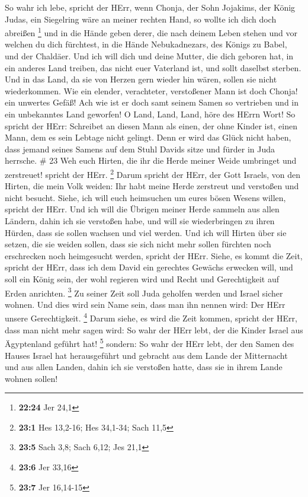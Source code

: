  So wahr ich lebe, spricht der HErr, wenn Chonja, der Sohn
Jojakims, der König Judas, ein Siegelring wäre an meiner rechten Hand,
so wollte ich dich doch abreißen \footnote{\textbf{22:24} Jer 24,1}
 und in die Hände geben derer, die nach deinem Leben stehen
und vor welchen du dich fürchtest, in die Hände Nebukadnezars, des
Königs zu Babel, und der Chaldäer.  Und ich will dich und
deine Mutter, die dich geboren hat, in ein anderes Land treiben, das
nicht euer Vaterland ist, und sollt daselbst sterben.  Und
in das Land, da sie von Herzen gern wieder hin wären, sollen sie nicht
wiederkommen.  Wie ein elender, verachteter, verstoßener
Mann ist doch Chonja! ein unwertes Gefäß! Ach wie ist er doch samt
seinem Samen so vertrieben und in ein unbekanntes Land geworfen!
 O Land, Land, Land, höre des HErrn Wort!  So
spricht der HErr: Schreibet an diesen Mann als einen, der ohne Kinder
ist, einen Mann, dem es sein Lebtage nicht gelingt. Denn er wird das
Glück nicht haben, dass jemand seines Samens auf dem Stuhl Davids sitze
und fürder in Juda herrsche. \# 23  Weh euch Hirten, die ihr
die Herde meiner Weide umbringet und zerstreuet! spricht der HErr.
\footnote{\textbf{23:1} Hes 13,2-16; Hes 34,1-34; Sach 11,5}
 Darum spricht der HErr, der Gott Israels, von den Hirten,
die mein Volk weiden: Ihr habt meine Herde zerstreut und verstoßen und
nicht besucht. Siehe, ich will euch heimsuchen um eures bösen Wesens
willen, spricht der HErr.  Und ich will die Übrigen meiner
Herde sammeln aus allen Ländern, dahin ich sie verstoßen habe, und will
sie wiederbringen zu ihren Hürden, dass sie sollen wachsen und viel
werden.  Und ich will Hirten über sie setzen, die sie weiden
sollen, dass sie sich nicht mehr sollen fürchten noch erschrecken noch
heimgesucht werden, spricht der HErr.  Siehe, es kommt die
Zeit, spricht der HErr, dass ich dem David ein gerechtes Gewächs
erwecken will, und soll ein König sein, der wohl regieren wird und Recht
und Gerechtigkeit auf Erden anrichten. \footnote{\textbf{23:5} Sach 3,8;
  Sach 6,12; Jes 21,1}  Zu seiner Zeit soll Juda geholfen
werden und Israel sicher wohnen. Und dies wird sein Name sein, dass man
ihn nennen wird: Der HErr unsere Gerechtigkeit. \footnote{\textbf{23:6}
  Jer 33,16}  Darum siehe, es wird die Zeit kommen, spricht
der HErr, dass man nicht mehr sagen wird: So wahr der HErr lebt, der die
Kinder Israel aus Ägyptenland geführt hat! \footnote{\textbf{23:7} Jer
  16,14-15}  sondern: So wahr der HErr lebt, der den Samen
des Hauses Israel hat herausgeführt und gebracht aus dem Lande der
Mitternacht und aus allen Landen, dahin ich sie verstoßen hatte, dass
sie in ihrem Lande wohnen sollen!

